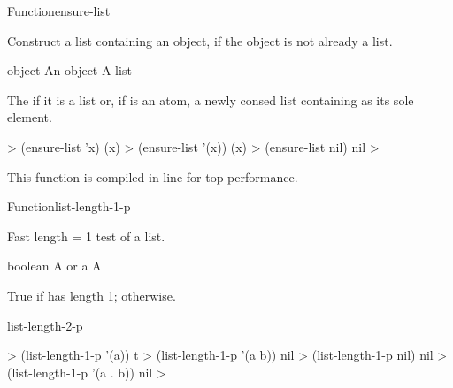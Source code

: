 \documentclass[10pt,twoside,english,pdftex]{article}
\newcommand{\inline}{This function is compiled in-line for top performance.}
\begin{document}

\begin{functiondoc}{Function}{ensure-list}{ 
    \returns{} }
%

\fnsyntax

\fnpurpose Construct a list containing an object, if the object is not
already a list.

\fnpackage {}

\fnmodule {}

\fnargs
\begin{args}{object}
\arg[object] An object
\arg[list] A list
\end{args}

\fnreturns The  if it is a list or, if  is
an atom, a newly consed list containing  as its sole element.
  
\fnexamples
%
\W\supp
\begin{example}
  > (ensure-list 'x)
  (x)
  > (ensure-list '(x))
  (x)
  > (ensure-list nil)
  nil
  >
\end{example}

\fnnote \inline

\end{functiondoc}


\begin{functiondoc}{Function}{list-length-1-p}%
  { 
    \returns{} }
%
%

\fnsyntax

\fnpurpose Fast length = 1 test of a list.

\fnpackage {}

\fnmodule {}

\fnargs
\begin{args}{boolean}
\arg[list] A  or a 
\arg[boolean] A 
\end{args}

\fnreturns True if  has length 1; \nil{} otherwise.

\begin{alsos}{list-length-2-p}
\end{alsos}

\fnexamples
%
\W\supp
\begin{example}
  > (list-length-1-p '(a))
  t
  > (list-length-1-p '(a b))
  nil
  > (list-length-1-p nil)
  nil
  > (list-length-1-p '(a . b))
  nil
  >
\end{example}

\end{functiondoc}
\end{document}
